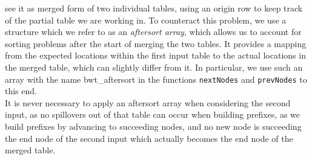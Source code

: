 \documentclass[a4paper,12pt,twoside,BCOR=10mm]{scrbook}
\begin{document}
see it as merged form of two individual tables, using an origin row to keep track of the partial table
we are working in.
To counteract this problem, we use a structure which we refer to as an \textit{aftersort array},
which allows us to account for sorting problems after the start of merging the two tables.
It provides a mapping from the expected locations within the first input table 
to the actual locations in the merged table, which can slightly differ from it.
In particular, we use such an array with the name bwt\_aftersort in
the functions \texttt{nextNodes} and \texttt{prevNodes} to this end. \\
It is never necessary to apply an aftersort array when considering the second input,
as no spillovers out of that table can occur when building prefixes, as we build
prefixes by advancing to succeeding nodes, and no new node is succeeding the end node
of the second input which actually becomes the end node of the merged table.
\end{document}
